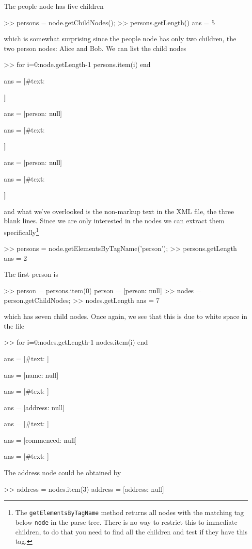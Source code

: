 The people node has five children
\begin{Code}
>> persons = node.getChildNodes();
>> persons.getLength()
ans =
     5
\end{Code}
which is somewhat surprising since the people node has only two children, the two person nodes: Alice and Bob.
We can list the child nodes
\begin{Code}
>> for i=0:node.getLength-1
   persons.item(i)
 end

ans =
[#text: 

    ]

ans =
[person: null]

ans =
[#text: 

    ]

ans =
[person: null]

ans =
[#text: 

]
\end{Code}
and what we've overlooked is the non-markup text in the XML file, the three blank lines.
Since we are only interested in the  nodes we can extract them specifically\footnote{The \texttt{getElementsByTagName} method
returns all nodes with the matching tag below \texttt{node} in the parse tree.  There is no way to restrict this to immediate children, to do that you need to find all the children and test if they have this tag.}
\begin{Code}
>> persons = node.getElementsByTagName('person');
>> persons.getLength
ans =
     2
\end{Code}   
The first person is 
\begin{Code}
>> person = persons.item(0)
person =
[person: null]
>> nodes = person.getChildNodes;
>> nodes.getLength
ans =
     7
\end{Code} 
which has seven child nodes.
Once again, we see that this is due to white space in the file
\begin{Code}
>> for i=0:nodes.getLength-1
    nodes.item(i)
end

ans =
[#text: 
      ]

ans =
[name: null]

ans =
[#text: 
      ]

ans =
[address: null]

ans =
[#text: 
      ]

ans =
[commenced: null]

ans =
[#text: 
    ]
\end{Code}
The address node could be obtained by
\begin{Code}
>> address = nodes.item(3)
address =
[address: null]
\end{Code}
